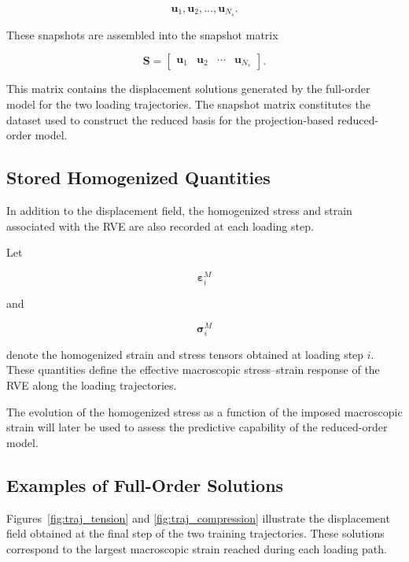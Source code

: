 \documentclass[11pt,a4paper]{article}
\begin{document}
\begin{equation}
\mathbf{u}_1,\mathbf{u}_2,\dots,\mathbf{u}_{N_s} .
\end{equation}

These snapshots are assembled into the snapshot matrix

\begin{equation}
\mathbf{S}
=
\begin{bmatrix}
\mathbf{u}_1 &
\mathbf{u}_2 &
\cdots &
\mathbf{u}_{N_s}
\end{bmatrix}.
\end{equation}

This matrix contains the displacement solutions generated by the full-order model for the two loading trajectories. The snapshot matrix constitutes the dataset used to construct the reduced basis for the projection-based reduced-order model.

\subsection{Stored Homogenized Quantities}

In addition to the displacement field, the homogenized stress and strain associated with the RVE are also recorded at each loading step.

Let

\begin{equation}
\boldsymbol{\varepsilon}^{M}_i
\end{equation}

and

\begin{equation}
\boldsymbol{\sigma}^{M}_i
\end{equation}

denote the homogenized strain and stress tensors obtained at loading step $i$. These quantities define the effective macroscopic stress--strain response of the RVE along the loading trajectories.

The evolution of the homogenized stress as a function of the imposed macroscopic strain will later be used to assess the predictive capability of the reduced-order model.

\subsection{Examples of Full-Order Solutions}

Figures~\ref{fig:traj_tension} and \ref{fig:traj_compression} illustrate the displacement field obtained at the final step of the two training trajectories. These solutions correspond to the largest macroscopic strain reached during each loading path.
\end{document}

